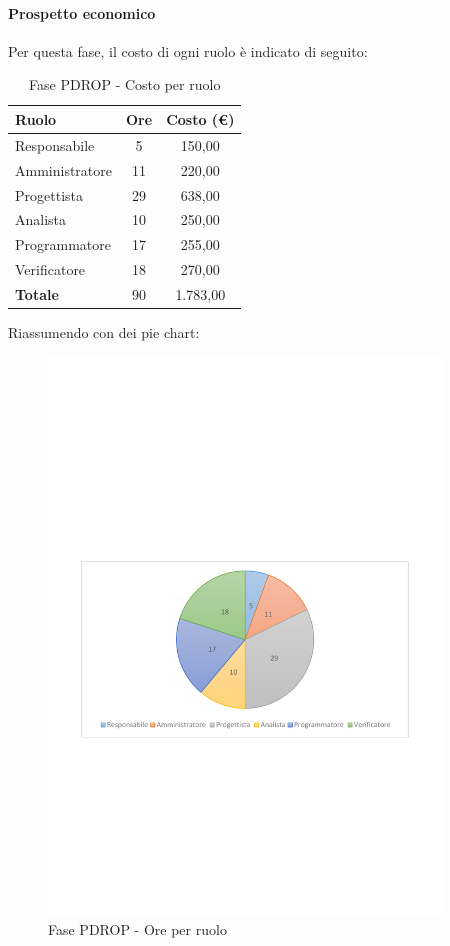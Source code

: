 \documentclass[../PianoProgetto.tex]{subfiles}
\begin{document}
	\paragraph{Prospetto economico}
					Per questa fase\g, il costo di ogni ruolo è indicato di seguito:
	\begin{table}[h]
		\centering
	
		\begin{tabular}{l * {2}{c}}
			\toprule
			\textbf{Ruolo} & \textbf{Ore} & \textbf{Costo (\euro{})} \\
			\midrule
			Responsabile &	5 & 150,00 \\
			Amministratore & 11 & 220,00 \\
			Progettista & 29 & 638,00 \\
			Analista & 10 & 250,00 \\
			Programmatore & 17 & 255,00 \\
			Verificatore & 18 & 270,00 \\
			\midrule		
			\textbf{Totale} & 90 & 1.783,00 \\
			\bottomrule
		\end{tabular}
		\caption{Fase PDROP - Costo per ruolo}
		\label{tab:fasePDROP_costo}
	\end{table}
\vfill	
\newpage
\vfill	
	Riassumendo con dei pie chart:
	\begin{figure}[!h]
		\centering
		\includegraphics[width=0.93\textwidth , trim=2cm 9.5cm 2cm 11cm]{grafici/PDROP/PDROP-ore-ruolo}
			\caption{Fase PDROP - Ore per ruolo}
		\label{fig:CircleChart-fasePDRD_ore_r}
	\end{figure}
\end{document}
